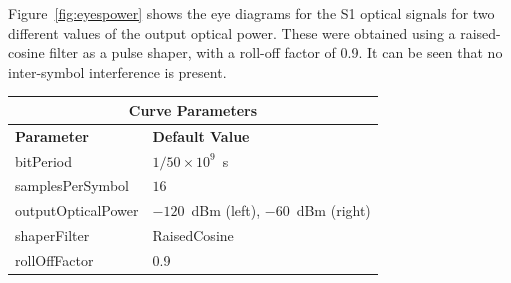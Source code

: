 Figure~\ref{fig:eyespower} shows the eye diagrams for the S1 optical signals
for two different values of the output optical power. These were obtained using
a
raised-cosine filter as a pulse shaper, with a roll-off factor of 0.9. It can
be seen that no inter-symbol interference is present.

\begin{table}[H]
			\centering
			\footnotesize
	\begin{tabular}{|l|l|}
		\hline
		\multicolumn{2}{|c|}{ \textbf{Curve Parameters} } \\
		\hline
		\textbf{Parameter}     & \textbf{Default Value}                                     \\\hline
		bitPeriod              & $1/50\times10^9$~s														\\\hline
		samplesPerSymbol       & $16$                                                       \\\hline
		outputOpticalPower     & $-120$~dBm (left), $-60$~dBm (right)                       \\ \hline
		shaperFilter	       & RaisedCosine												\\ \hline
		rollOffFactor		   & 0.9														\\ \hline
		
	\end{tabular}
\end{table}

